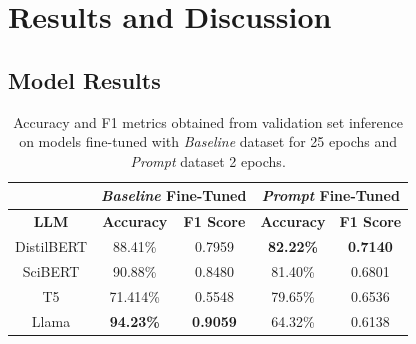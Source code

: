 \section{Results and Discussion}

\subsection{Model Results}
\begin{table}[h!]
\centering
\caption{
    Accuracy and F1 metrics obtained from validation set inference on models fine-tuned
    with \textit{Baseline} dataset for 25 epochs and \textit{Prompt} dataset 2
    epochs.
}
\begin{threeparttable}
\begin{tabular}{|c|c|c|c|c|}
\hline
& \multicolumn{2}{c|}{\textbf{\textit{Baseline} Fine-Tuned}} & \multicolumn{2}{c|}{\textbf{\textit{Prompt} Fine-Tuned}} \\ \hline
\textbf{LLM}    & \textbf{Accuracy} & \textbf{F1 Score} & \textbf{Accuracy} & \textbf{F1 Score} \\ \hline
DistilBERT      & 88.41\%           & 0.7959            & \textbf{82.22\%}  & \textbf{0.7140}   \\ \hline
SciBERT         & 90.88\%           & 0.8480            & 81.40\%           & 0.6801            \\ \hline
T5              & 71.414\%          & 0.5548            & 79.65\%           & 0.6536            \\ \hline
Llama           & \textbf{94.23\%}  & \textbf{0.9059}   & 64.32\%           & 0.6138            \\ \hline
\end{tabular}
\end{threeparttable}
\label{tab:model_accuracy_values}
\end{table}

